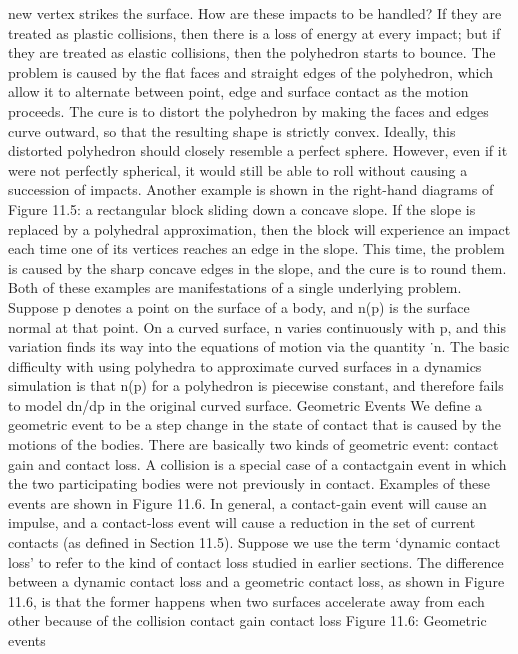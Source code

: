 new vertex strikes the surface. How are these impacts to be handled? If they are treated as plastic collisions, then there is a loss of energy at every impact; but if they are treated as elastic collisions, then the polyhedron starts to bounce. The problem is caused by the flat faces and straight edges of the polyhedron, which allow it to alternate between point, edge and surface contact as the motion proceeds. The cure is to distort the polyhedron by making the faces and edges curve outward, so that the resulting shape is strictly convex. Ideally, this distorted polyhedron should closely resemble a perfect sphere. However, even if it were not perfectly spherical, it would still be able to roll without causing a succession of impacts. Another example is shown in the right-hand diagrams of Figure 11.5: a rectangular block sliding down a concave slope. If the slope is replaced by a polyhedral approximation, then the block will experience an impact each time one of its vertices reaches an edge in the slope. This time, the problem is caused by the sharp concave edges in the slope, and the cure is to round them. Both of these examples are manifestations of a single underlying problem. Suppose p denotes a point on the surface of a body, and n(p) is the surface normal at that point. On a curved surface, n varies continuously with p, and this variation finds its way into the equations of motion via the quantity ˙n. The basic difficulty with using polyhedra to approximate curved surfaces in a dynamics simulation is that n(p) for a polyhedron is piecewise constant, and therefore fails to model dn/dp in the original curved surface. Geometric Events We define a geometric event to be a step change in the state of contact that is caused by the motions of the bodies. There are basically two kinds of geometric event: contact gain and contact loss. A collision is a special case of a contactgain event in which the two participating bodies were not previously in contact. Examples of these events are shown in Figure 11.6. In general, a contact-gain event will cause an impulse, and a contact-loss event will cause a reduction in the set of current contacts (as defined in Section 11.5). Suppose we use the term ‘dynamic contact loss’ to refer to the kind of contact loss studied in earlier sections. The difference between a dynamic contact loss and a geometric contact loss, as shown in Figure 11.6, is that the former happens when two surfaces accelerate away from each other because of the collision contact gain contact loss Figure 11.6: Geometric events

